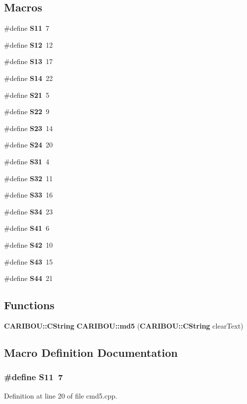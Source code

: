 \subsection*{Macros}
\begin{DoxyCompactItemize}
\item 
\#define {\bf S11}~7
\item 
\#define {\bf S12}~12
\item 
\#define {\bf S13}~17
\item 
\#define {\bf S14}~22
\item 
\#define {\bf S21}~5
\item 
\#define {\bf S22}~9
\item 
\#define {\bf S23}~14
\item 
\#define {\bf S24}~20
\item 
\#define {\bf S31}~4
\item 
\#define {\bf S32}~11
\item 
\#define {\bf S33}~16
\item 
\#define {\bf S34}~23
\item 
\#define {\bf S41}~6
\item 
\#define {\bf S42}~10
\item 
\#define {\bf S43}~15
\item 
\#define {\bf S44}~21
\end{DoxyCompactItemize}
\subsection*{Functions}
\begin{DoxyCompactItemize}
\item 
{\bf C\+A\+R\+I\+B\+O\+U\+::\+C\+String} {\bf C\+A\+R\+I\+B\+O\+U\+::md5} ({\bf C\+A\+R\+I\+B\+O\+U\+::\+C\+String} clear\+Text)
\end{DoxyCompactItemize}


\subsection{Macro Definition Documentation}
\subsubsection[{S11}]{\setlength{\rightskip}{0pt plus 5cm}\#define S11~7}\label{cmd5_8cpp_a51398c0e5541164ad4d6615880073305}


Definition at line 20 of file cmd5.\+cpp.

